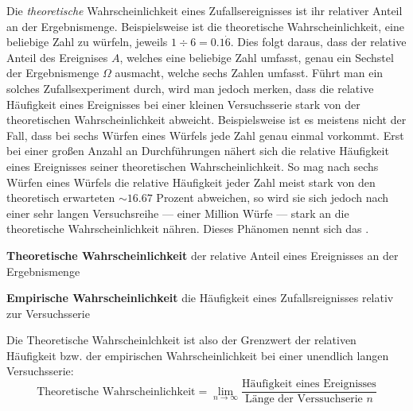 Die \emph{theoretische} Wahrscheinlichkeit eines Zufallsereignisses ist ihr relativer Anteil an der Ergebnismenge. Beispielsweise ist die theoretische Wahrscheinlichkeit, eine beliebige Zahl zu w\"{u}rfeln, jeweils $1 \div 6 = 0.1\dot{6}$. Dies folgt daraus, dass der relative Anteil des Ereignises $A$, welches eine beliebige Zahl umfasst, genau ein Sechstel der Ergebnismenge $\Omega$ ausmacht, welche sechs Zahlen umfasst. F\"{u}hrt man ein solches Zufallsexperiment durch, wird man jedoch merken, dass die relative H\"{a}ufigkeit eines Ereignisses bei einer kleinen Versuchsserie stark von der theoretischen Wahrscheinlichkeit abweicht. Beispielsweise ist es meistens nicht der Fall, dass bei sechs W\"{u}rfen eines W\"{u}rfels jede Zahl genau einmal vorkommt. Erst bei einer gro\ss{}en Anzahl an Durchf\"{u}hrungen n\"{a}hert sich die relative H\"{a}ufigkeit eines Ereignisses seiner theoretischen Wahrscheinlichkeit. So mag nach sechs W\"{u}rfen eines W\"{u}rfels die relative H\"{a}ufigkeit jeder Zahl meist stark von den theoretisch erwarteten $\sim 16.67$ Prozent abweichen, so wird sie sich jedoch nach einer sehr langen Versuchsreihe --- einer Million W\"{u}rfe --- stark an die theoretische Wahrscheinlichkeit n\"{a}hren. Dieses Ph\"{a}nomen nennt sich das .

\pagebreak

\textbf{Theoretische Wahrscheinlichkeit}  der relative Anteil eines Ereignisses an der Ergebnismenge

\textbf{Empirische Wahrscheinlichkeit}  die H\"{a}ufigkeit eines Zufallsreignisses relativ zur Versuchsserie

Die Theoretische Wahrscheinlchkeit ist also der Grenzwert der relativen H\"{a}ufigkeit bzw. der empirischen Wahrscheinlichkeit bei einer unendlich langen Versuchsserie: $$\text{Theoretische Wahrscheinlichkeit} = \lim_{n \rightarrow \infty} \frac{\text{H\"{a}ufigkeit eines Ereignisses}}{\text{L\"{a}nge der Verssuchserie } n}$$

